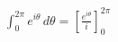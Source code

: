\documentclass[preview]{standalone}
\begin{document}
\begin{align*}
\int_0^{2\pi} e^{i\theta} \, d\theta = \left[\frac{e^{i\theta}}{i}\right]_0^{2\pi}
\end{align*}
\end{document}
